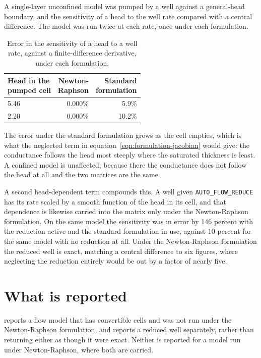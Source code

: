 A single-layer unconfined model was pumped by a well against a general-head boundary, and the sensitivity of a head to the well rate compared with a central difference. The model was run twice at each rate, once under each formulation.

\begin{table}[htb]
	\centering
	\caption{Error in the sensitivity of a head to a well rate, against a
	finite-difference derivative, under each formulation.}
	\label{tab:formulation}
	\small
	\begin{tabular}{lrr}
		\toprule
		\shortstack[l]{Head in the\\pumped cell} &
		\shortstack[r]{Newton-\\Raphson} &
		\shortstack[r]{Standard\\formulation} \\
		\midrule
		5.46 & 0.000\% & 5.9\%   \\
		2.20 & 0.000\% & 10.2\%  \\
		\bottomrule
	\end{tabular}
\end{table}

The error under the standard formulation grows as the cell empties, which is what the neglected term in equation~\ref{eqn:formulation-jacobian} would give: the conductance follows the head most steeply where the saturated thickness is least. A confined model is unaffected, because there the conductance does not follow the head at all and the two matrices are the same.

A second head-dependent term compounds this. A well given \texttt{AUTO\_FLOW\_REDUCE} has its rate scaled by a smooth function of the head in its cell, and that dependence is likewise carried into the matrix only under the Newton-Raphson formulation. On the same model the sensitivity was in error by 146 percent with the reduction active and the standard formulation in use, against 10 percent for the same model with no reduction at all. Under the Newton-Raphson formulation the reduced well is exact, matching a central difference to six figures, where neglecting the reduction entirely would be out by a factor of nearly five.

\section*{What is reported}

\adj{} reports a flow model that has convertible cells and was not run under the Newton-Raphson formulation, and reports a reduced well separately, rather than returning either as though it were exact. Neither is reported for a model run under Newton-Raphson, where both are carried.

